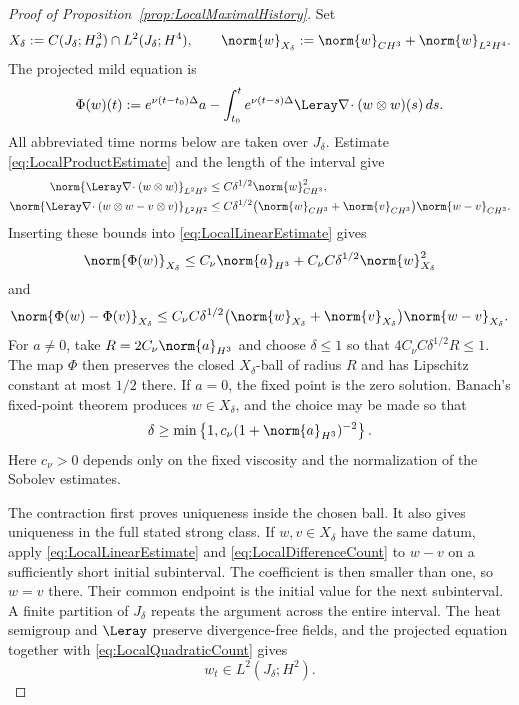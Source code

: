 \begin{proof}[Proof of Proposition~\ref{prop:LocalMaximalHistory}]
Set
\[
  X_\delta
  :=C(J_\delta;H^3_\sigma)\cap L^2(J_\delta;H^4),
  \qquad
  \norm{w}_{X_\delta}
  :=\norm{w}_{C H^3}+\norm{w}_{L^2H^4}.
\]
The projected mild equation is
\begin{equation}
  \Phi(w)(t)
  :=e^{\nu(t-t_0)\Delta}a
  -\int_{t_0}^{t}e^{\nu(t-s)\Delta}
    \Leray\nabla\!\cdot(w\otimes w)(s)\,ds.
  \label{eq:LocalMildMap}
\end{equation}
All abbreviated time norms below are taken over \(J_\delta\). Estimate
\eqref{eq:LocalProductEstimate} and the length of the interval give
\begin{align}
  \norm{\Leray\nabla\!\cdot(w\otimes w)}_{L^2H^2}
  &\leq C\delta^{1/2}\norm{w}_{C H^3}^2,
  \label{eq:LocalQuadraticCount}
  \\
  \norm{\Leray\nabla\!\cdot(w\otimes w-v\otimes v)}_{L^2H^2}
  &\leq C\delta^{1/2}
  \bigl(\norm{w}_{C H^3}+\norm{v}_{C H^3}\bigr)
  \norm{w-v}_{C H^3}.
  \label{eq:LocalDifferenceCount}
\end{align}
Inserting these bounds into \eqref{eq:LocalLinearEstimate} gives
\[
  \norm{\Phi(w)}_{X_\delta}
  \leq C_\nu\norm{a}_{H^3}
  +C_\nu C\delta^{1/2}\norm{w}_{X_\delta}^2
\]
and
\[
  \norm{\Phi(w)-\Phi(v)}_{X_\delta}
  \leq C_\nu C\delta^{1/2}
  \bigl(\norm{w}_{X_\delta}+\norm{v}_{X_\delta}\bigr)
  \norm{w-v}_{X_\delta}.
\]
For \(a\neq0\), take \(R=2C_\nu\norm{a}_{H^3}\) and choose
\(\delta\leq1\) so that \(4C_\nu C\delta^{1/2}R\leq1\). The map \(\Phi\)
then preserves the closed \(X_\delta\)-ball of radius \(R\) and has Lipschitz
constant at most \(1/2\) there. If \(a=0\), the fixed point is the zero
solution. Banach's fixed-point theorem produces \(w\in X_\delta\), and the
choice may be made so that
\begin{equation}
  \delta
  \geq
  \min\left\{1,c_\nu(1+\norm{a}_{H^3})^{-2}\right\}.
  \label{eq:LocalLifespan}
\end{equation}
Here \(c_\nu>0\) depends only on the fixed viscosity and the normalization of
the Sobolev estimates.

The contraction first proves uniqueness inside the chosen ball. It also gives
uniqueness in the full stated strong class. If \(w,v\in X_\delta\) have the
same datum, apply \eqref{eq:LocalLinearEstimate} and
\eqref{eq:LocalDifferenceCount} to \(w-v\) on a sufficiently short initial
subinterval. The coefficient is then smaller than one, so \(w=v\) there.
Their common endpoint is the initial value for the next subinterval. A finite
partition of \(J_\delta\) repeats the argument across the entire interval.
The heat semigroup and \(\Leray\) preserve divergence-free fields, and the
projected equation together with \eqref{eq:LocalQuadraticCount} gives
\begin{equation}
  w_t\in L^2(J_\delta;H^2).
  \label{eq:LocalTimeRow}
\end{equation}


\end{proof}
